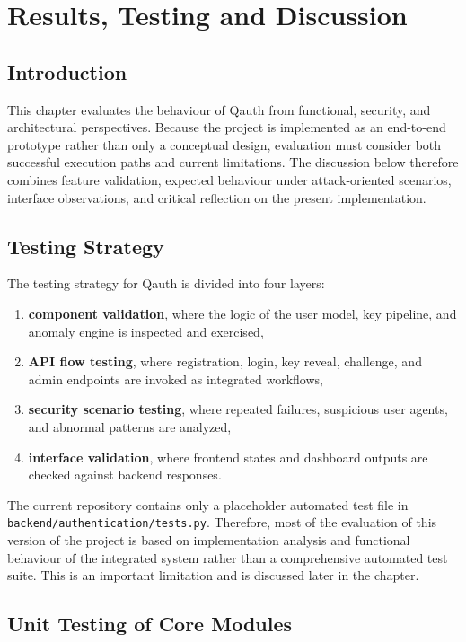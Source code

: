 \chapter{Results, Testing and Discussion}

\section{Introduction}
This chapter evaluates the behaviour of Qauth from functional, security, and architectural perspectives. Because the project is implemented as an end-to-end prototype rather than only a conceptual design, evaluation must consider both successful execution paths and current limitations. The discussion below therefore combines feature validation, expected behaviour under attack-oriented scenarios, interface observations, and critical reflection on the present implementation.

\section{Testing Strategy}
The testing strategy for Qauth is divided into four layers:

\begin{enumerate}
    \item \textbf{component validation}, where the logic of the user model, key pipeline, and anomaly engine is inspected and exercised,
    \item \textbf{API flow testing}, where registration, login, key reveal, challenge, and admin endpoints are invoked as integrated workflows,
    \item \textbf{security scenario testing}, where repeated failures, suspicious user agents, and abnormal patterns are analyzed,
    \item \textbf{interface validation}, where frontend states and dashboard outputs are checked against backend responses.
\end{enumerate}

The current repository contains only a placeholder automated test file in \texttt{backend/authentication/tests.py}. Therefore, most of the evaluation of this version of the project is based on implementation analysis and functional behaviour of the integrated system rather than a comprehensive automated test suite. This is an important limitation and is discussed later in the chapter.

\section{Unit Testing of Core Modules}

